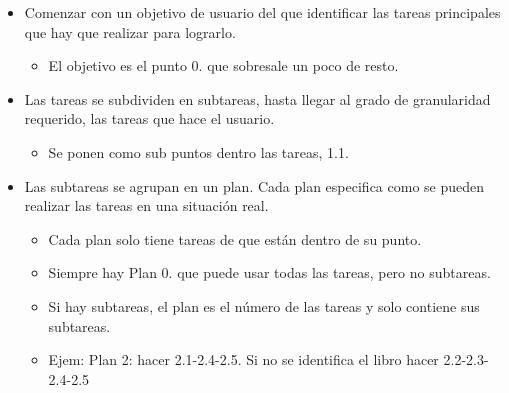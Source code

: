 \documentclass[12pt, twoside, openright]{report} %
\begin{document}
        \begin{itemize}
        
        \item
          Comenzar con un objetivo de usuario del que identificar las
          tareas principales que hay que realizar para lograrlo.

          \begin{itemize}
          
          \item
            El objetivo es el punto 0. que sobresale un poco de resto.
          \end{itemize}
        \item
          Las tareas se subdividen en subtareas, hasta llegar al grado
          de granularidad requerido, las tareas que hace el usuario.

          \begin{itemize}
          
          \item
            Se ponen como sub puntos dentro las tareas, 1.1.
          \end{itemize}
        \item
          Las subtareas se agrupan en un plan. Cada plan especifica como
          se pueden realizar las tareas en una situación real.

          \begin{itemize}
          
          \item
            Cada plan solo tiene tareas de que están dentro de su punto.
          \item
            Siempre hay Plan 0. que puede usar todas las tareas, pero no
            subtareas.
          \item
            Si hay subtareas, el plan es el número de las tareas y solo
            contiene sus subtareas.
          \item
            Ejem: Plan 2: hacer 2.1-2.4-2.5. Si no se identifica el
            libro hacer 2.2-2.3-2.4-2.5
          \end{itemize}
        \end{itemize}
\end{document}
